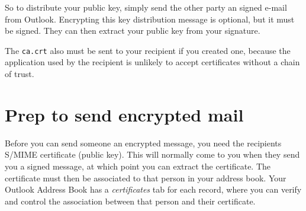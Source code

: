 \documentclass[pdftex,12pt,titlepage=false]{scrartcl}
\begin{document}
So to distribute your public key, simply send the other party an
signed e-mail from Outlook.  Encrypting this key distribution message
is optional, but it must be signed.  They can then extract your public
key from your signature.

The \verb|ca.crt| also must be sent to your recipient if you created
one, because the application used by the recipient is unlikely to
accept certificates without a chain of trust.

\section{Prep to send encrypted mail%
}
Before you can send someone an encrypted message, you need the
recipients S/MIME certificate (public key).  This will normally come
to you when they send you a signed message, at which point you can
extract the certificate.  The certificate must then be associated to
that person in your address book.  Your Outlook Address Book has a
\emph{certificates} tab for each record, where you can verify and
control the association between that person and their certificate.
\end{document}
